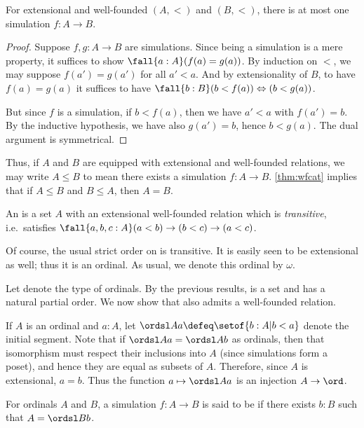\begin{lem}
  For extensional and well-founded $(A,<)$ and $(B,<)$, there is at most one simulation $f:A\to B$.
\end{lem}
\begin{proof}
  Suppose $f,g:A\to B$ are simulations.
  Since being a simulation is a mere property, it suffices to show $\fall{a:A}(f(a)=g(a))$.
  By induction on $<$, we may suppose $f(a')=g(a')$ for all $a'<a$.
  And by extensionality of $B$, to have $f(a)=g(a)$ it suffices to have $\fall{b:B}(b<f(a)) \Leftrightarrow (b<g(a))$.

  But since $f$ is a simulation, if $b<f(a)$, then we have $a'<a$ with $f(a')=b$.
  By the inductive hypothesis, we have also $g(a')=b$, hence $b<g(a)$.
  The dual argument is symmetrical.
\end{proof}

Thus, if $A$ and $B$ are equipped with extensional and well-founded relations, we may write $A\le B$ to mean there exists a simulation $f:A\to B$.
\cref{thm:wfcat} implies that if $A\le B$ and $B\le A$, then $A=B$.

\begin{defn}
  An 
  is a set $A$ with an extensional well-founded relation which is \emph{transitive}, i.e.\ satisfies $\fall{a,b,c:A}(a<b)\to (b<c) \to (a<c)$.
\end{defn}

\begin{eg}
  Of course, the usual strict order on \nat is transitive.
  It is easily seen to be extensional as well; thus it is an ordinal.
  As usual, we denote this ordinal by $\omega$.
\end{eg}

Let \ord denote the type of ordinals.
By the previous results, \ord is a set and has a natural partial order.
We now show that \ord also admits a well-founded relation.

If $A$ is an ordinal and $a:A$, let $\ordsl A a \defeq \setof{ b:A | b<a}$ denote the initial segment.
%
Note that if $\ordsl A a = \ordsl A b$ as ordinals, then that isomorphism must respect their inclusions into $A$ (since simulations form a poset), and hence they are equal as subsets of $A$.
Therefore, since $A$ is extensional, $a=b$.
Thus the function $a\mapsto \ordsl A a$ is an injection $A\to \ord$.

\begin{defn}
  For ordinals $A$ and $B$, a simulation $f:A\to B$ is said to be 
  if there exists $b:B$ such that $A = \ordsl B b$.
\end{defn}

